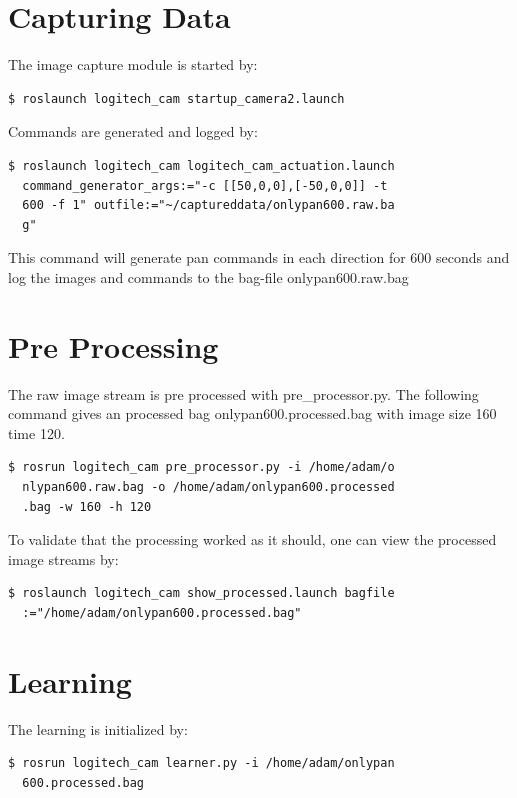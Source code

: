 \documentclass[10pt]{report}
\begin{document}
\section{Capturing Data}
The image capture module is started by:
\begin{framed}
\begin{lstlisting}
$ roslaunch logitech_cam startup_camera2.launch
\end{lstlisting}
\end{framed}

Commands are generated and logged by:
\begin{framed}
\begin{lstlisting}
$ roslaunch logitech_cam logitech_cam_actuation.launch 
  command_generator_args:="-c [[50,0,0],[-50,0,0]] -t 
  600 -f 1" outfile:="~/captureddata/onlypan600.raw.ba
  g"
\end{lstlisting}
\end{framed}
This command will generate pan commands in each direction for 600 seconds and log the images and commands to the bag-file onlypan600.raw.bag


\section{Pre Processing}
The raw image stream is pre processed with pre\_processor.py. The following command gives an processed bag onlypan600.processed.bag with image size 160 time 120.
\begin{framed}
\begin{lstlisting}
$ rosrun logitech_cam pre_processor.py -i /home/adam/o
  nlypan600.raw.bag -o /home/adam/onlypan600.processed
  .bag -w 160 -h 120
\end{lstlisting}
\end{framed}


To validate that the processing worked as it should, one can view the processed image streams by:
\begin{framed}
\begin{lstlisting}
$ roslaunch logitech_cam show_processed.launch bagfile
  :="/home/adam/onlypan600.processed.bag"
\end{lstlisting}
\end{framed}

\section{Learning}
The learning is initialized by:
\begin{framed}
\begin{lstlisting}
$ rosrun logitech_cam learner.py -i /home/adam/onlypan
  600.processed.bag
\end{lstlisting}
\end{framed}
\end{document}
